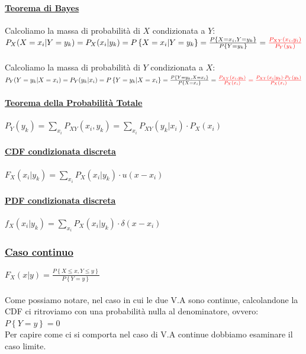 \documentclass{article}
\begin{document}
\paragraph{\underline{Teorema di Bayes}}
Calcoliamo la massa di probabilità di $X$ condizionata a $Y$: \\
$P_X(X = x_i |Y=y_k) = P_X(x_i|y_k) = P \left\{X = x_i | Y = y_k \right\} = \frac{P \left\{X=x_i,Y=y_k\right\}}{P\left\{  Y = y_k\right\}} = 
\color{red} \frac{P_{XY}(x_i,y_i) }{P_Y (y_k)}$ \\ \\
Calcoliamo la massa di probabilità di $Y$ condizionata a $X$: \\
$P_Y(Y = y_k |X = x_i) = P_Y(y_k|x_i) = P \left\{ Y = y_k | X = x_i\right\} = \frac{P \left\{Y=y_k, X=x_i\right\}}{P\left\{  X = x_i\right\}} = 
\color{red} \frac{P_{XY}(x_i,y_k) }{P_X (x_i)} = \color{red} \frac{P_{XY}(x_i|y_k) \cdot P_Y(y_k)}{P_X (x_i)}$
\paragraph{\underline{Teorema della Probabilità Totale}}
$P_Y(y_k) = \sum_{x_i} P_{XY}(x_i,y_k) = \sum_{x_i} P_{XY}(y_k|x_i) \cdot P_X(x_i)$
\paragraph{\underline{CDF condizionata discreta}}
$F_X(x_i|y_k) = \sum_{x_i} P_X(x_i|y_k) \cdot u(x-x_i)$
\paragraph{\underline{PDF condizionata discreta}}
$f_X(x_i|y_k) = \sum_{x_i} P_X(x_i|y_k) \cdot \delta(x-x_i)$
\subsubsection{\underline{Caso continuo}}
$F_X(x|y) = \frac{P\left\{ X \leq x, Y \leq y \right\}}{P\left\{ Y = y\right\}}$ \\ \\
Come possiamo notare, nel caso in cui le due V.A sono continue, calcolandone la CDF ci ritroviamo con una probabilità nulla al denominatore, ovvero: $P\left\{ Y = y\right\} = 0$ \\ 
Per capire come ci si comporta nel caso di V.A continue dobbiamo esaminare il caso limite. 
\end{document}
